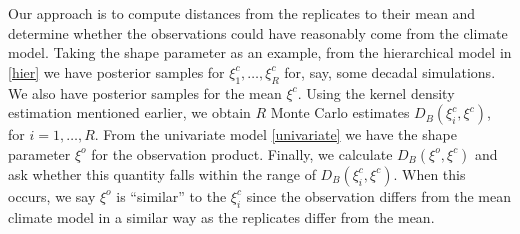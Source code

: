 Our approach is to compute distances from the replicates to their mean and determine whether the observations could have reasonably come from the climate model. Taking the shape parameter as an example, from the hierarchical model in \ref{hier} we have posterior samples for $\xi_1^c,\ldots,\xi_R^c$ for, say, some decadal simulations. We also have posterior samples for the mean $\xi^c$. Using the kernel density estimation mentioned earlier, we obtain $R$ Monte Carlo estimates $D_B(\xi_i^c, \xi^c)$, for $i=1,\ldots,R$. From the univariate model \ref{univariate} we have the shape parameter $\xi^o$ for the observation product. Finally, we calculate $D_B(\xi^o, \xi^c)$ and ask whether this quantity falls within the range of $D_B(\xi_i^c, \xi^c)$. When this occurs, we say $\xi^o$ is ``similar'' to the $\xi_i^c$ since the observation differs from the mean climate model in a similar way as the replicates differ from the mean.
